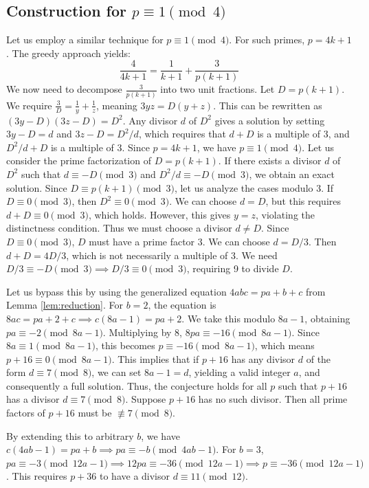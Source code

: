 \documentclass[11pt,a4paper]{article}
\begin{document}
\subsection{Construction for $p \equiv 1 \pmod{4}$}
Let us employ a similar technique for $p \equiv 1 \pmod{4}$. For such primes, $p = 4k+1$.
The greedy approach yields:
\begin{equation}
\frac{4}{4k+1} = \frac{1}{k+1} + \frac{3}{p(k+1)}
\end{equation}
We now need to decompose $\frac{3}{p(k+1)}$ into two unit fractions. Let $D = p(k+1)$. We require $\frac{3}{D} = \frac{1}{y} + \frac{1}{z}$, meaning $3yz = D(y+z)$. This can be rewritten as $(3y - D)(3z - D) = D^2$.
Any divisor $d$ of $D^2$ gives a solution by setting $3y - D = d$ and $3z - D = D^2/d$, which requires that $d+D$ is a multiple of 3, and $D^2/d + D$ is a multiple of 3.
Since $p = 4k+1$, we have $p \equiv 1 \pmod{4}$.
Let us consider the prime factorization of $D = p(k+1)$. If there exists a divisor $d$ of $D^2$ such that $d \equiv -D \pmod{3}$ and $D^2/d \equiv -D \pmod{3}$, we obtain an exact solution.
Since $D \equiv p(k+1) \pmod{3}$, let us analyze the cases modulo 3.
If $D \equiv 0 \pmod{3}$, then $D^2 \equiv 0 \pmod{3}$. We can choose $d=D$, but this requires $d+D \equiv 0 \pmod{3}$, which holds. However, this gives $y=z$, violating the distinctness condition. Thus we must choose a divisor $d \neq D$. Since $D \equiv 0 \pmod{3}$, $D$ must have a prime factor 3. We can choose $d = D/3$. Then $d + D = 4D/3$, which is not necessarily a multiple of 3. We need $D/3 \equiv -D \pmod{3} \implies D/3 \equiv 0 \pmod{3}$, requiring 9 to divide $D$.

Let us bypass this by using the generalized equation $4abc = pa + b + c$ from Lemma \ref{lem:reduction}.
For $b=2$, the equation is $8ac = pa + 2 + c \implies c(8a - 1) = pa + 2$.
We take this modulo $8a - 1$, obtaining $pa \equiv -2 \pmod{8a-1}$.
Multiplying by 8, $8pa \equiv -16 \pmod{8a-1}$. Since $8a \equiv 1 \pmod{8a-1}$, this becomes $p \equiv -16 \pmod{8a-1}$, which means $p+16 \equiv 0 \pmod{8a-1}$.
This implies that if $p+16$ has any divisor $d$ of the form $d \equiv 7 \pmod{8}$, we can set $8a-1 = d$, yielding a valid integer $a$, and consequently a full solution.
Thus, the conjecture holds for all $p$ such that $p+16$ has a divisor $d \equiv 7 \pmod{8}$.
Suppose $p+16$ has no such divisor. Then all prime factors of $p+16$ must be $\not\equiv 7 \pmod{8}$.

By extending this to arbitrary $b$, we have $c(4ab - 1) = pa + b \implies pa \equiv -b \pmod{4ab-1}$.
For $b=3$, $pa \equiv -3 \pmod{12a-1} \implies 12pa \equiv -36 \pmod{12a-1} \implies p \equiv -36 \pmod{12a-1}$. This requires $p+36$ to have a divisor $d \equiv 11 \pmod{12}$.
\end{document}
